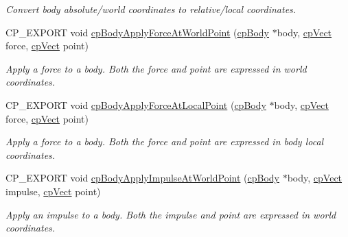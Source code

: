 \begin{DoxyCompactItemize}
\begin{DoxyCompactList}\small\item\em Convert body absolute/world coordinates to relative/local coordinates. \end{DoxyCompactList}\item 
\mbox{\label{group__cp_body_ga94ce4fa01218cbec17338829804c1025}} 
C\+P\+\_\+\+E\+X\+P\+O\+RT void \mbox{\hyperlink{group__cp_body_ga94ce4fa01218cbec17338829804c1025}{cp\+Body\+Apply\+Force\+At\+World\+Point}} (\mbox{\hyperlink{structcp_body}{cp\+Body}} $\ast$body, \mbox{\hyperlink{structcp_vect}{cp\+Vect}} force, \mbox{\hyperlink{structcp_vect}{cp\+Vect}} point)
\begin{DoxyCompactList}\small\item\em Apply a force to a body. Both the force and point are expressed in world coordinates. \end{DoxyCompactList}\item 
\mbox{\label{group__cp_body_ga3441a367681abd6074fa2fe351038c66}} 
C\+P\+\_\+\+E\+X\+P\+O\+RT void \mbox{\hyperlink{group__cp_body_ga3441a367681abd6074fa2fe351038c66}{cp\+Body\+Apply\+Force\+At\+Local\+Point}} (\mbox{\hyperlink{structcp_body}{cp\+Body}} $\ast$body, \mbox{\hyperlink{structcp_vect}{cp\+Vect}} force, \mbox{\hyperlink{structcp_vect}{cp\+Vect}} point)
\begin{DoxyCompactList}\small\item\em Apply a force to a body. Both the force and point are expressed in body local coordinates. \end{DoxyCompactList}\item 
\mbox{\label{group__cp_body_ga279494c5ddcfd7d76ec23ab7906d99dd}} 
C\+P\+\_\+\+E\+X\+P\+O\+RT void \mbox{\hyperlink{group__cp_body_ga279494c5ddcfd7d76ec23ab7906d99dd}{cp\+Body\+Apply\+Impulse\+At\+World\+Point}} (\mbox{\hyperlink{structcp_body}{cp\+Body}} $\ast$body, \mbox{\hyperlink{structcp_vect}{cp\+Vect}} impulse, \mbox{\hyperlink{structcp_vect}{cp\+Vect}} point)
\begin{DoxyCompactList}\small\item\em Apply an impulse to a body. Both the impulse and point are expressed in world coordinates. \end{DoxyCompactList}\item 
\mbox{\label{group__cp_body_ga0bd09fbbf2a3260b7cda569dacec0a33}} 

\end{DoxyCompactItemize}
